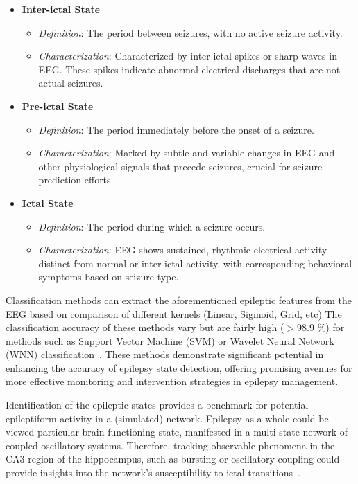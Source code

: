 \begin{itemize}
    \item \textbf{Inter-ictal State}
          \begin{itemize}
              \item \textit{Definition}: The period between seizures, with no active seizure activity.
              \item \textit{Characterization}: Characterized by inter-ictal spikes or sharp waves in EEG\@.
                    These spikes indicate abnormal electrical discharges that are not actual seizures.
          \end{itemize}
    \item \textbf{Pre-ictal State}
          \begin{itemize}
              \item \textit{Definition}: The period immediately before the onset of a seizure.
              \item \textit{Characterization}: Marked by subtle and variable changes in EEG and other physiological signals that precede seizures,
                    crucial for seizure prediction efforts.
          \end{itemize}
    \item \textbf{Ictal State}
          \begin{itemize}
              \item \textit{Definition}: The period during which a seizure occurs.
              \item \textit{Characterization}: EEG shows sustained, rhythmic electrical activity distinct from normal or inter-ictal activity,
                    with corresponding behavioral symptoms based on seizure type.
          \end{itemize}
\end{itemize}

\noindent Classification methods can extract the aforementioned epileptic features from the EEG based on comparison of
different kernels (Linear, Sigmoid, Grid, etc) The classification accuracy of these methods vary but are fairly high (\(>\)98.9 \%) for methods such as
Support Vector Machine (SVM) or Wavelet Neural Network (WNN) classification~\parencite{yayikEpilepticStateDetection2015}.
These methods demonstrate significant potential in enhancing the accuracy of epilepsy state detection, offering promising avenues for more
effective monitoring and intervention strategies in epilepsy management.

Identification of the epileptic states provides a benchmark for potential epileptiform activity in a (simulated) network.
Epilepsy as a whole could be viewed particular brain functioning state, manifested in a multi-state network of coupled oscillatory systems.
Therefore, tracking observable phenomena in the CA3 region of the hippocampus, such as bursting or oscillatory coupling could provide insights
into the network's susceptibility to ictal transitions~\parencite{kalitzinEpilepsyManifestationMultistate2019a}.

